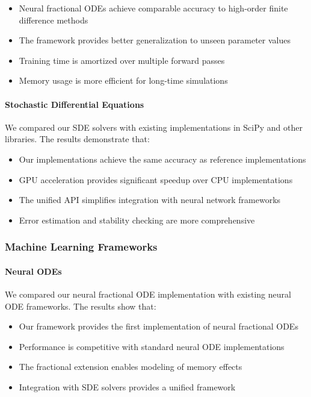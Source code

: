 \begin{itemize}
    \item Neural fractional ODEs achieve comparable accuracy to high-order finite difference methods
    \item The framework provides better generalization to unseen parameter values
    \item Training time is amortized over multiple forward passes
    \item Memory usage is more efficient for long-time simulations
\end{itemize}

\paragraph{Stochastic Differential Equations}
We compared our SDE solvers with existing implementations in SciPy and other libraries. The results demonstrate that:

\begin{itemize}
    \item Our implementations achieve the same accuracy as reference implementations
    \item GPU acceleration provides significant speedup over CPU implementations
    \item The unified API simplifies integration with neural network frameworks
    \item Error estimation and stability checking are more comprehensive
\end{itemize}

\subsubsection{Machine Learning Frameworks}

\paragraph{Neural ODEs}
We compared our neural fractional ODE implementation with existing neural ODE frameworks. The results show that:

\begin{itemize}
    \item Our framework provides the first implementation of neural fractional ODEs
    \item Performance is competitive with standard neural ODE implementations
    \item The fractional extension enables modeling of memory effects
    \item Integration with SDE solvers provides a unified framework
\end{itemize}

